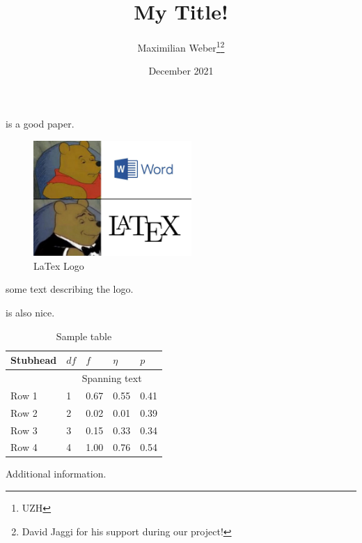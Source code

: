 \documentclass{article}
\title{My Title!}
\author{Maximilian Weber\thanks{UZH}\;\thanks{David Jaggi for his support during our project!}}
\date{December 2021}
\begin{document}
\maketitle

\begin{abstract}
    \blindtext
\end{abstract}
\newpage

\blindtext[3]
\cite{KozlowskiEtAlTailWags} is a good paper.

\begin{figure}
    \centering
    \includegraphics[width=6cm]{meme.jpg}
    \caption{LaTex Logo}
\end{figure}
some text describing the logo.

\blindtext[3]
\cite{NielsRalphCoronavirus} is also nice.

\begin{table}
    \centering  
  \begin{threeparttable}
     \begin{tabular}{lllll}
        \toprule
        Stubhead & \( df \) & \( f \) & \( \eta \) & \( p \) \\
        \midrule
                 &     \multicolumn{4}{c}{Spanning text}     \\
        Row 1    & 1        & 0.67    & 0.55       & 0.41    \\
        Row 2    & 2        & 0.02    & 0.01       & 0.39    \\
        Row 3    & 3        & 0.15    & 0.33       & 0.34    \\
        Row 4    & 4        & 1.00    & 0.76       & 0.54    \\
        \bottomrule
     \end{tabular}
    \begin{tablenotes}
      \small
      \item Additional information.
    \end{tablenotes}
    \caption{Sample table}
  \end{threeparttable}
\end{table}

\blindtext[4]

\printbibliography
\end{document}
